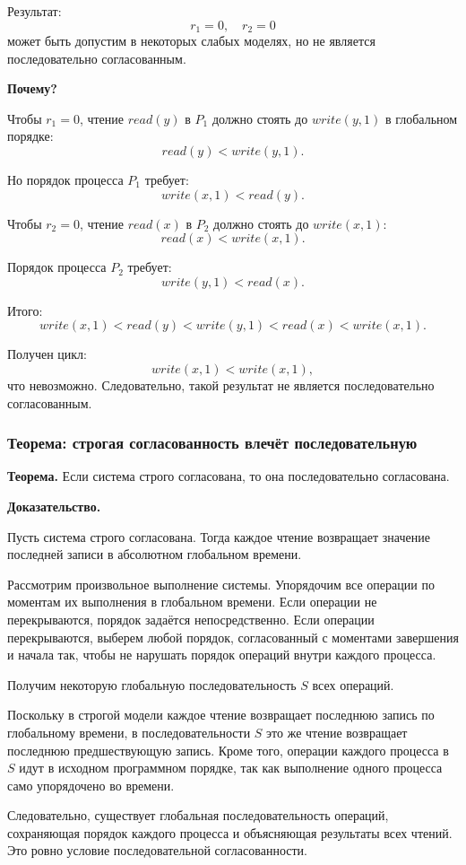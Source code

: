 \documentclass[12pt,a4paper]{article}
\begin{document}
Результат:
\[
r_1 = 0,\quad r_2 = 0
\]
может быть допустим в некоторых слабых моделях, но не является последовательно согласованным.

\textbf{Почему?}

Чтобы $r_1 = 0$, чтение $read(y)$ в $P_1$ должно стоять до $write(y,1)$ в глобальном порядке:
\[
read(y) < write(y,1).
\]

Но порядок процесса $P_1$ требует:
\[
write(x,1) < read(y).
\]

Чтобы $r_2 = 0$, чтение $read(x)$ в $P_2$ должно стоять до $write(x,1)$:
\[
read(x) < write(x,1).
\]

Порядок процесса $P_2$ требует:
\[
write(y,1) < read(x).
\]

Итого:
\[
write(x,1) < read(y) < write(y,1) < read(x) < write(x,1).
\]

Получен цикл:
\[
write(x,1) < write(x,1),
\]
что невозможно. Следовательно, такой результат не является последовательно согласованным.

\subsubsection{Теорема: строгая согласованность влечёт последовательную}

\textbf{Теорема.}
Если система строго согласована, то она последовательно согласована.

\textbf{Доказательство.}

Пусть система строго согласована. Тогда каждое чтение возвращает значение последней записи в абсолютном глобальном времени.

Рассмотрим произвольное выполнение системы. Упорядочим все операции по моментам их выполнения в глобальном времени. Если операции не перекрываются, порядок задаётся непосредственно. Если операции перекрываются, выберем любой порядок, согласованный с моментами завершения и начала так, чтобы не нарушать порядок операций внутри каждого процесса.

Получим некоторую глобальную последовательность $S$ всех операций.

Поскольку в строгой модели каждое чтение возвращает последнюю запись по глобальному времени, в последовательности $S$ это же чтение возвращает последнюю предшествующую запись. Кроме того, операции каждого процесса в $S$ идут в исходном программном порядке, так как выполнение одного процесса само упорядочено во времени.

Следовательно, существует глобальная последовательность операций, сохраняющая порядок каждого процесса и объясняющая результаты всех чтений. Это ровно условие последовательной согласованности.
\end{document}
